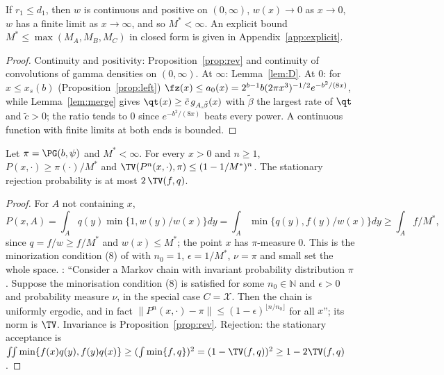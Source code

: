 \begin{proposition}\label{prop:bounded}
If $r_1\le d_1$, then $w$ is continuous and positive on $(0,\infty)$, $w(x)\to0$ as $x\to0$, $w$ has a finite
limit as $x\to\infty$, and so $M^*<\infty$. An explicit bound $M^*\le\max(M_A,M_B,M_C)$ in closed form is given
in Appendix~\ref{app:explicit}.
\end{proposition}
\begin{proof}
Continuity and positivity: Proposition~\ref{prop:rev} and continuity of convolutions of gamma densities on
$(0,\infty)$. At $\infty$: Lemma~\ref{lem:D}. At 0: for $x\le x_s(b)$ (Proposition~\ref{prop:left}) $\fz(x)\le
a_0(x)=2^{b-1}b(2\pi x^3)^{-1/2}e^{-b^2/(8x)}$, while Lemma~\ref{lem:merge} gives $\qt(x)\ge\tilde c\,g_{A,\tilde
\beta}(x)$ with $\tilde\beta$ the largest rate of $\qt$ and $\tilde c>0$; the ratio tends to 0 since
$e^{-b^2/(8x)}$ beats every power. A continuous function with finite limits at both ends is bounded.
\end{proof}

\begin{theorem}\label{thm:row}
Let $\pi=\PG(b,\psi)$ and $M^*<\infty$. For every $x>0$ and $n\ge1$,
$P(x,\cdot)\ge\pi(\cdot)/M^*$ and $\TV(P^n(x,\cdot),\pi)\le(1-1/M^*)^n$. The stationary rejection probability is
at most $2\,\TV(f,q)$.
\end{theorem}
\begin{proof}
For $A$ not containing $x$,
\[P(x,A)=\int_Aq(y)\min\{1,w(y)/w(x)\}dy=\int_A\min\{q(y),f(y)/w(x)\}dy\ge\int_Af/M^*,\]
since $q=f/w\ge f/M^*$ and $w(x)\le M^*$; the point $x$ has $\pi$-measure 0. This is the
minorization condition (8) of \cite{rr} with $n_0=1$, $\epsilon=1/M^*$, $\nu=\pi$ and small set the whole space.
\cite[Thm.~8]{rr}: ``Consider a Markov chain with invariant probability distribution $\pi$. Suppose the
minorisation condition (8) is satisfied for some $n_0\in\mathbb N$ and $\epsilon>0$ and probability measure
$\nu$, in the special case $C=\mathcal X$. Then the chain is uniformly ergodic, and in fact $\|P^n(x,\cdot)-\pi\|
\le(1-\epsilon)^{\lfloor n/n_0\rfloor}$ for all $x$''; its norm is $\TV$. Invariance is
Proposition~\ref{prop:rev}. Rejection: the stationary acceptance is $\iint\min\{f(x)q(y),f(y)q(x)\}\ge(\int\min
\{f,q\})^2=(1-\TV(f,q))^2\ge1-2\TV(f,q)$.
\end{proof}

